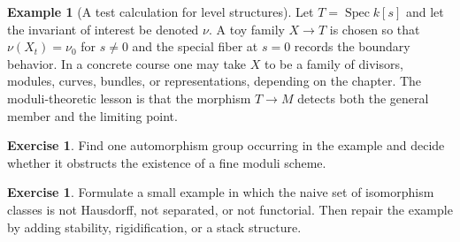 \documentclass[11pt]{amsart}
\theoremstyle{definition}
\newtheorem{example}[theorem]{Example}
\newtheorem{exercise}[theorem]{Exercise}
\newcommand{\Spec}{\operatorname{Spec}}
\begin{document}
\begin{example}[A test calculation for level structures]
Let $T=\Spec k[s]$ and let the invariant of interest be denoted $\nu$.  A toy family $X\to T$ is chosen so that $\nu(X_t)=\nu_0$ for $s\ne0$ and the special fiber at $s=0$ records the boundary behavior.  In a concrete course one may take $X$ to be a family of divisors, modules, curves, bundles, or representations, depending on the chapter.  The moduli-theoretic lesson is that the morphism $T\to M$ detects both the general member and the limiting point.
\end{example}
\begin{exercise}
Find one automorphism group occurring in the example and decide whether it obstructs the existence of a fine moduli scheme.
\end{exercise}
\begin{exercise}
Formulate a small example in which the naive set of isomorphism classes is not Hausdorff, not separated, or not functorial.  Then repair the example by adding stability, rigidification, or a stack structure.
\end{exercise}
\clearpage
\end{document}
